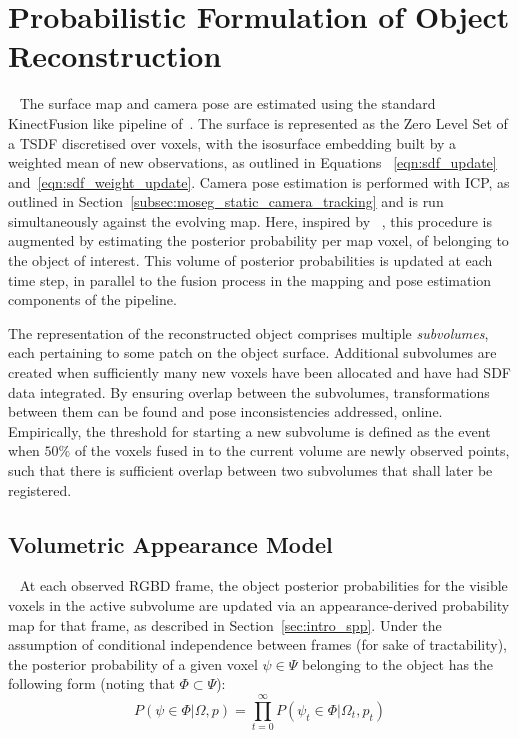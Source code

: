 \section{Probabilistic Formulation of Object Reconstruction}
~\label{sec:probobj_prob_formulation}
The surface map and camera pose are estimated using the standard KinectFusion
like pipeline of~\cite{Newcombe2011,Prisacariu2014}. The surface is represented
as the Zero Level Set of a TSDF discretised over voxels, with the isosurface 
embedding built by a weighted mean of new observations, as outlined in Equations
~\ref{eqn:sdf_update} and~\ref{eqn:sdf_weight_update}. Camera pose estimation is
performed with ICP, as outlined in Section~\ref{subsec:moseg_static_camera_tracking} 
and is run simultaneously against the evolving map. Here, inspired by 
~\cite{Kolev2006}, this procedure is augmented by estimating the posterior probability 
per map voxel, of belonging to the object of interest. This volume of posterior 
probabilities is updated at each time step, in parallel to the fusion process in the 
mapping and pose estimation components of the pipeline. 

The representation of the reconstructed object comprises multiple \textit{subvolumes}, 
each pertaining to some patch on the object surface. Additional subvolumes are created 
when sufficiently many new voxels have been allocated and have had SDF data integrated. 
By ensuring overlap between the subvolumes, transformations between them can be found and 
pose inconsistencies addressed, online. Empirically, the threshold for starting a new
subvolume is defined as the event when \( 50\% \) of the voxels fused in to the
current volume are newly observed points, such that there is sufficient overlap 
between two subvolumes that shall later be registered.

\subsection{Volumetric Appearance Model}
~\label{subsec:probobj_vol_appearance_model}
At each observed RGBD frame, the object posterior probabilities for the visible
voxels in the active subvolume are updated via an appearance-derived probability
map for that frame, as described in Section~\ref{sec:intro_spp}. Under the assumption 
of conditional independence between frames (for sake of tractability), the posterior 
probability of a given voxel \( \psi \in \Psi \) belonging to the object has the following 
form (noting that \( \Phi \subset \Psi \)):
\begin{equation}
\label{eqn:probobj_voxel_posterior}
P(\psi \in \Phi | \Omega, p) = \prod_{t=0}^{\infty}
P(\psi_{t} \in \Phi | \Omega_{t}, p_{t})
\end{equation}

